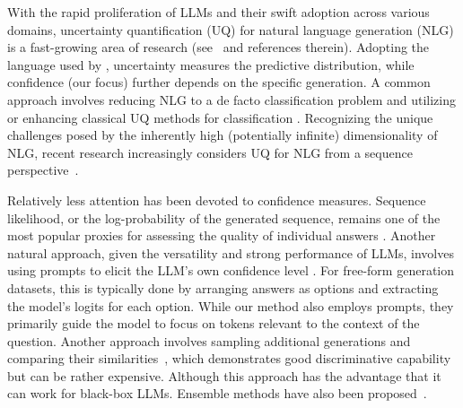 With the rapid proliferation of LLMs and their swift adoption across various domains, uncertainty quantification (UQ) for natural language generation (NLG) is a fast-growing area of research (see~\citet{baan2023uncertainty} and references therein). 
Adopting the language used by \citet{lin2023generating}, uncertainty measures the predictive distribution, while confidence (our focus) further depends on the specific generation.
A common approach involves reducing NLG to a de facto classification problem and utilizing or enhancing classical UQ methods for classification \citep{desai-durrett-2020-calibration,jiang-etal-2021-know,kamath-etal-2020-selective,wang-etal-2022-uncertainty,xiong2023llms}.
Recognizing the unique challenges posed by the inherently high (potentially infinite) dimensionality of NLG, recent research increasingly considers UQ for NLG from a sequence perspective~\citep{hou2023decomposing,kuhn2023semantic,malinin2021uncertainty,lin2023generating}.

Relatively less attention has been devoted to confidence measures. Sequence likelihood, or the log-probability of the generated sequence, remains one of the most popular proxies for assessing the quality of individual answers \citep{quach2023conformal,kuhn2023semantic,cole2023selectively}. Another natural approach, given the versatility and strong performance of LLMs, involves using prompts to elicit the LLM's own confidence level \cite{kadavath2022language,Lin2022TeachingMT,DBLP:journals/corr/abs-2012-14983,chen2023quantifying,he2023investigating,li2024think,wightman2023strength,tian-etal-2023-just}.
For free-form generation datasets, this is typically done by arranging answers as options and extracting the model's logits for each option. %
While our method also employs prompts, they primarily guide the model to focus on tokens relevant to the context of the question. %
Another approach involves sampling additional generations and comparing their similarities~\citep{lin2023generating,cole2023selectively}, which demonstrates good discriminative capability but can be rather expensive. Although this approach has the advantage that it can work for black-box LLMs.
Ensemble methods have also been proposed~\citep{chen2023quantifying}.

